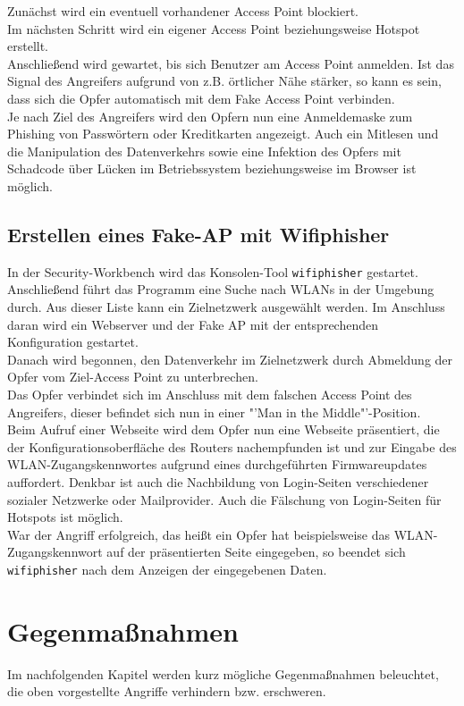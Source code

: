 Zunächst wird ein eventuell vorhandener Access Point blockiert. \\
Im nächsten Schritt wird ein eigener Access Point beziehungsweise Hotspot erstellt. \\
Anschließend wird gewartet, bis sich Benutzer am Access Point anmelden. Ist das Signal des Angreifers aufgrund von z.B. örtlicher Nähe stärker, so kann es sein, dass sich die Opfer automatisch mit dem Fake Access Point verbinden. \\
Je nach Ziel des Angreifers wird den Opfern nun eine Anmeldemaske zum Phishing von Passwörtern oder Kreditkarten angezeigt.
Auch ein Mitlesen und die Manipulation des Datenverkehrs sowie eine Infektion des Opfers mit Schadcode über Lücken im Betriebssystem beziehungsweise im Browser ist möglich.

\subsection{Erstellen eines Fake-AP mit Wifiphisher}
In der Security-Workbench wird das Konsolen-Tool \colorbox{altgray}{\lstinline|wifiphisher|} gestartet.\\
Anschließend führt das Programm eine Suche nach WLANs in der Umgebung durch. Aus dieser Liste kann ein  Zielnetzwerk ausgewählt werden. Im Anschluss daran wird ein Webserver und der Fake AP mit der entsprechenden Konfiguration gestartet. \\
Danach wird begonnen, den Datenverkehr im Zielnetzwerk durch Abmeldung der Opfer vom Ziel-Access Point zu unterbrechen. \\
Das Opfer verbindet sich im Anschluss mit dem falschen Access Point des Angreifers, dieser befindet sich nun in einer "'Man in the Middle"'-Position. \\
Beim Aufruf einer Webseite wird dem Opfer nun eine Webseite präsentiert, die der Konfigurationsoberfläche des Routers nachempfunden ist und zur Eingabe des WLAN-Zugangskennwortes aufgrund eines durchgeführten Firmwareupdates auffordert. Denkbar ist auch die Nachbildung von Login-Seiten verschiedener sozialer Netzwerke oder Mailprovider. Auch die Fälschung von Login-Seiten für Hotspots ist möglich. \\
War der Angriff erfolgreich, das heißt ein Opfer hat beispielsweise das WLAN-Zugangskennwort auf der präsentierten Seite eingegeben, so beendet sich \colorbox{altgray}{\lstinline|wifiphisher|} nach dem Anzeigen der eingegebenen Daten.

\section{Gegenmaßnahmen}
Im nachfolgenden Kapitel werden kurz mögliche Gegenmaßnahmen beleuchtet, die oben vorgestellte Angriffe verhindern bzw. erschweren.
